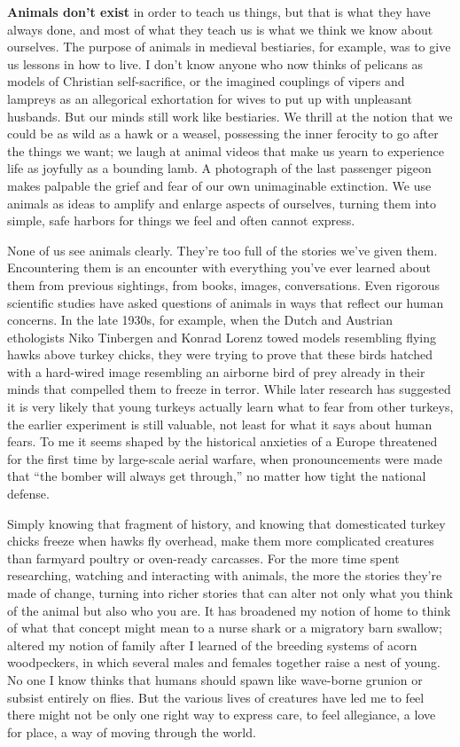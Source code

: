\textbf{Animals don't exist} in order to teach us things, but that is
what they have always done, and most of what they teach us is what we
think we know about ourselves. The purpose of animals in medieval
bestiaries, for example, was to give us lessons in how to live. I don't
know anyone who now thinks of pelicans as models of Christian
self-sacrifice, or the imagined couplings of vipers and lampreys as an
allegorical exhortation for wives to put up with unpleasant husbands.
But our minds still work like bestiaries. We thrill at the notion that
we could be as wild as a hawk or a weasel, possessing the inner ferocity
to go after the things we want; we laugh at animal videos that make us
yearn to experience life as joyfully as a bounding lamb. A photograph of
the last passenger pigeon makes palpable the grief and fear of our own
unimaginable extinction. We use animals as ideas to amplify and enlarge
aspects of ourselves, turning them into simple, safe harbors for things
we feel and often cannot express.

None of us see animals clearly. They're too full of the stories we've
given them. Encountering them is an encounter with everything you've
ever learned about them from previous sightings, from books, images,
conversations. Even rigorous scientific studies have asked questions of
animals in ways that reflect our human concerns. In the late 1930s, for
example, when the Dutch and Austrian ethologists Niko Tinbergen and
Konrad Lorenz towed models resembling flying hawks above turkey chicks,
they were trying to prove that these birds hatched with a hard-wired
image resembling an airborne bird of prey already in their minds that
compelled them to freeze in terror. While later research has suggested
it is very likely that young turkeys actually learn what to fear from
other turkeys, the earlier experiment is still valuable, not least for
what it says about human fears. To me it seems shaped by the historical
anxieties of a Europe threatened for the first time by large-scale
aerial warfare, when pronouncements were made that ``the bomber will
always get through,'' no matter how tight the national defense.

Simply knowing that fragment of history, and knowing that domesticated
turkey chicks freeze when hawks fly overhead, make them more complicated
creatures than farmyard poultry or oven-ready carcasses. For the more
time spent researching, watching and interacting with animals, the more
the stories they're made of change, turning into richer stories that can
alter not only what you think of the animal but also who you are. It has
broadened my notion of home to think of what that concept might mean to
a nurse shark or a migratory barn swallow; altered my notion of family
after I learned of the breeding systems of acorn woodpeckers, in which
several males and females together raise a nest of young. No one I know
thinks that humans should spawn like wave-borne grunion or subsist
entirely on flies. But the various lives of creatures have led me to
feel there might not be only one right way to express care, to feel
allegiance, a love for place, a way of moving through the world.

